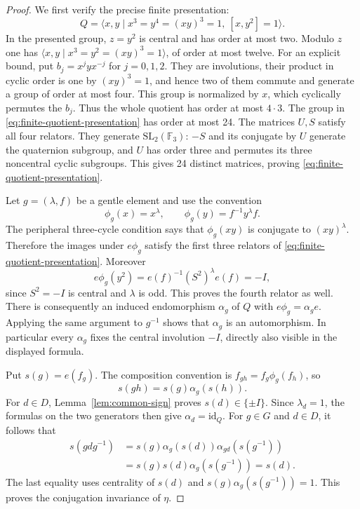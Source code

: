 \begin{proof}
We first verify the precise finite presentation:
\begin{equation}\label{eq:finite-quotient-presentation}
Q=\langle x,y\mid x^3=y^4=(xy)^3=1,\ [x,y^2]=1\rangle.
\end{equation}
In the presented group, $z=y^2$ is central and has order at most
two.  Modulo $z$ one has
$\langle x,y\mid x^3=y^2=(xy)^3=1\rangle$, of order at most
twelve.  For an explicit bound, put
$b_j=x^jyx^{-j}$ for $j=0,1,2$.  They are involutions, their
product in cyclic order is one by $(xy)^3=1$, and hence two
of them commute and generate a group of order at most four.
This group is normalized by $x$, which cyclically permutes the
$b_j$.  Thus the whole quotient has order at most $4\cdot3$.
The group in \eqref{eq:finite-quotient-presentation} has order at most 24.  The matrices $U,S$ satisfy
all four relators.  They generate $\mathrm{SL}_2(\mathbb F_3)$:
$-S$ and its conjugate by $U$ generate the quaternion subgroup,
and $U$ has order three and permutes its three noncentral cyclic
subgroups.  This gives 24 distinct matrices, proving \eqref{eq:finite-quotient-presentation}.

Let $g=(\lambda,f)$ be a gentle element and use the convention
\[
 \phi_g(x)=x^\lambda,\qquad
 \phi_g(y)=f^{-1}y^\lambda f.
\]
The peripheral three-cycle condition says that $\phi_g(xy)$
is conjugate to $(xy)^\lambda$.  Therefore the images under
$e\phi_g$ satisfy the first three relators of \eqref{eq:finite-quotient-presentation}.
Moreover
\[
 e\phi_g(y^2)=e(f)^{-1}(S^2)^\lambda e(f)=-I,
\]
since $S^2=-I$ is central and $\lambda$ is odd.
This proves the fourth relator as well.  There is consequently
an induced endomorphism $\alpha_g$ of $Q$ with
$e\phi_g=\alpha_ge$.  Applying the same argument to $g^{-1}$
shows that $\alpha_g$ is an automorphism.
In particular every $\alpha_g$ fixes the central involution
$-I$, directly also visible in the displayed formula.

Put $s(g)=e(f_g)$.  The composition convention is
$f_{gh}=f_g\phi_g(f_h)$, so
\[
 s(gh)=s(g)\alpha_g(s(h)).
\]
For $d\in D$, Lemma~\ref{lem:common-sign} proves
$s(d)\in\{\pm I\}$.  Since $\lambda_d=1$, the formulas on
the two generators then give $\alpha_d=\mathrm{id}_Q$.
For $g\in G$ and $d\in D$, it follows that
\[
 \begin{split}
 s(gdg^{-1})
 &=s(g)\alpha_g(s(d))\alpha_{gd}(s(g^{-1}))\\
 &=s(g)s(d)\alpha_g(s(g^{-1}))=s(d).
 \end{split}
\]
The last equality uses centrality of $s(d)$ and
$s(g)\alpha_g(s(g^{-1}))=1$.
This proves the conjugation invariance of $\eta$.
\end{proof}

